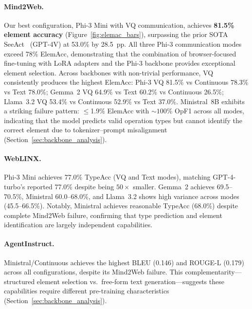\documentclass{article}
\begin{document}
\paragraph{Mind2Web.}
Our best configuration, Phi-3 Mini with VQ communication, achieves \textbf{81.5\% element accuracy} (Figure~\ref{fig:elemac_bars}), surpassing the prior SOTA SeeAct~\cite{zheng2024seeact} (GPT-4V) at 53.0\% by 28.5~pp.
All three Phi-3 communication modes exceed 78\% ElemAcc, demonstrating that the combination of browser-focused fine-tuning with LoRA adapters and the Phi-3 backbone provides exceptional element selection.
Across backbones with non-trivial performance, VQ consistently produces the highest ElemAcc: Phi-3 VQ 81.5\% vs Continuous 78.3\% vs Text 78.0\%; Gemma~2 VQ 64.9\% vs Text 60.2\% vs Continuous 26.5\%; Llama~3.2 VQ 53.4\% vs Continuous 52.9\% vs Text 37.0\%.
Ministral~8B exhibits a striking failure pattern: $\leq$1.9\% ElemAcc with ${\sim}100$\% OpF1 across all modes, indicating that the model predicts valid operation types but cannot identify the correct element due to tokenizer--prompt misalignment (Section~\ref{sec:backbone_analysis}).

\paragraph{WebLINX.}
Phi-3 Mini achieves 77.0\% TypeAcc (VQ and Text modes), matching GPT-4-turbo's reported 77.0\% despite being $50\times$ smaller.
Gemma~2 achieves 69.5--70.5\%, Ministral 60.0--68.0\%, and Llama~3.2 shows high variance across modes (45.5--66.5\%).
Notably, Ministral achieves reasonable TypeAcc (68.0\%) despite complete Mind2Web failure, confirming that type prediction and element identification are largely independent capabilities.

\paragraph{AgentInstruct.}
Ministral/Continuous achieves the highest BLEU (0.146) and ROUGE-L (0.179) across all configurations, despite its Mind2Web failure.
This complementarity---structured element selection vs.\ free-form text generation---suggests these capabilities require different pre-training characteristics (Section~\ref{sec:backbone_analysis}).
\end{document}
